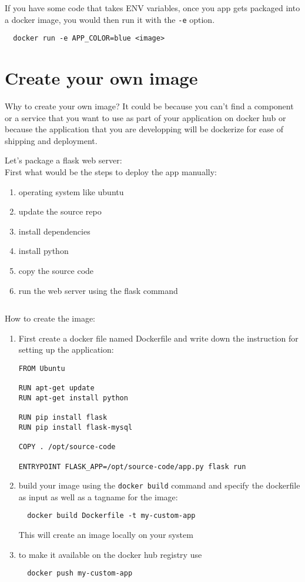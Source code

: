 \documentclass[french]{article}
\begin{document}
If you have some code that takes ENV variables, once you app gets packaged into a docker image, you would then run it with the \verb|-e| option.
\begin{verbatim}
  docker run -e APP_COLOR=blue <image>
\end{verbatim}

\section{Create your own image}

Why to create your own image? It could be because you can't find a component or a service that you want to use as part of your application on docker hub or because the application that you are developping will be dockerize for ease of shipping and deployment.

Let's package a flask web server:\\
First what would be the steps to deploy the app manually:
\begin{enumerate}
  \item  operating system like ubuntu
  \item update the source repo
  \item install dependencies
  \item install python
  \item copy the source code
  \item run the web server using the flask command 
\end{enumerate}$ $

How to create the image:
\begin{enumerate}
  \item First create a docker file named Dockerfile and write down the instruction for setting up the application:
\begin{verbatim}
FROM Ubuntu

RUN apt-get update
RUN apt-get install python

RUN pip install flask
RUN pip install flask-mysql

COPY . /opt/source-code

ENTRYPOINT FLASK_APP=/opt/source-code/app.py flask run
\end{verbatim}
\item build your image using the \verb|docker build| command and specify the dockerfile as input as well as a tagname for the image:
\begin{verbatim}
  docker build Dockerfile -t my-custom-app
\end{verbatim}
This will create an image locally on your system
\item to make it available on the docker hub registry use
\begin{verbatim}
  docker push my-custom-app
\end{verbatim}
\end{enumerate}
\end{document}
